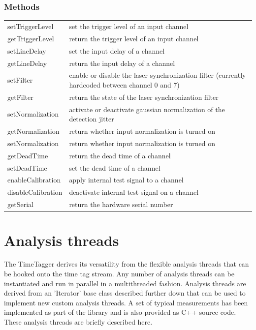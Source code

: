 \documentclass[oneside]{memoir}
\begin{document}
\subsubsection{Methods}
\begin{tabular}{p{}p{}}
  setTriggerLevel & set the trigger level of an input channel\\
  getTriggerLevel & return the trigger level of an input channel\\
  setLineDelay & set the input delay of a channel\\
  getLineDelay & return the input delay of a channel\\
  setFilter & enable or disable the laser synchronization filter (currently hardcoded between channel 0 and 7)\\
  getFilter & return the state of the laser synchronization filter\\
  setNormalization & activate or deactivate gaussian normalization of the
  detection jitter\\
  getNormalization & return whether input normalization is turned on\\
  setNormalization & return whether input normalization is turned on\\
  getDeadTime & return the dead time of a channel\\
  setDeadTime & set the dead time of a channel\\
  enableCalibration & apply internal test signal to a channel\\
  disableCalibration & deactivate internal test signal on a channel\\
  getSerial & return the hardware serial number\\
\end{tabular}

\section{Analysis threads}

The TimeTagger derives its versatility from the flexible analysis threads that can be hooked
onto the time tag stream. Any number of analysis threads can be instantiated and run in parallel in a
multithreaded fashion. Analysis threads are derived from an 'Iterator' base class described
further down that can be used to implement new custom analysis threads. A set of
typical measurements has been implemented as part of the library and is also
provided as C++ source code. These analysis threads are briefly described here.
\end{document}
